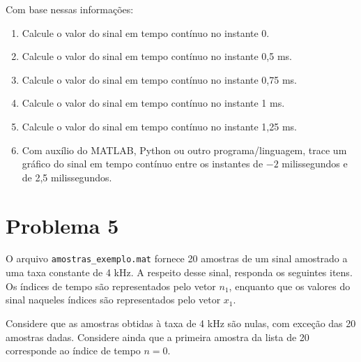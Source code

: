 \documentclass[12pt,a4paper]{article}
\begin{document}
\begin{center}
\end{center}

Com base nessas informações:

\begin{enumerate}
  \item Calcule o valor do sinal em tempo contínuo no instante 0.
  \item Calcule o valor do sinal em tempo contínuo no instante 0,5 ms.
  \item Calcule o valor do sinal em tempo contínuo no instante 0,75 ms.
  \item Calcule o valor do sinal em tempo contínuo no instante 1 ms.
  \item Calcule o valor do sinal em tempo contínuo no instante 1,25 ms.
  \item Com auxílio do MATLAB, Python ou outro programa/linguagem, trace um gráfico do sinal em
        tempo contínuo entre os instantes de $-2$ milissegundos e de 2,5 milissegundos.
\end{enumerate}

\section{Problema 5}
O arquivo \texttt{amostras\_exemplo.mat} fornece 20 amostras de um sinal amostrado a uma taxa
constante de 4 kHz. A respeito desse sinal, responda os seguintes itens. Os índices de tempo são
representados pelo vetor $n_1$, enquanto que os valores do sinal naqueles índices são
representados pelo vetor $x_1$.

Considere que as amostras obtidas à taxa de 4 kHz são nulas, com exceção das 20 amostras dadas.
Considere ainda que a primeira amostra da lista de 20 corresponde ao índice de tempo $n = 0$.
\end{document}
